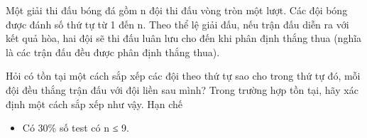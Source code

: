 Một giải thi đấu bóng đá gồm n đội thi đấu vòng tròn một lượt. Các đội bóng được đánh số thứ tự từ 1 đến n. Theo thể lệ giải đấu, nếu trận đấu diễn ra với kết quả hòa, hai đội sẽ thi đấu luân lưu cho đến khi phân định thắng thua (nghĩa là các trận đấu đều được phân định thắng thua).

Hỏi có tồn tại một cách sắp xếp các đội theo thứ tự sao cho trong thứ tự đó, mỗi đội đều thắng trận đấu với đội liền sau mình? Trong trường hợp tồn tại, hãy xác định một cách sắp xếp như vậy.
Hạn chế
\begin{itemize}
	\item Có 30\% số test có n ≤ 9.
\end{itemize}